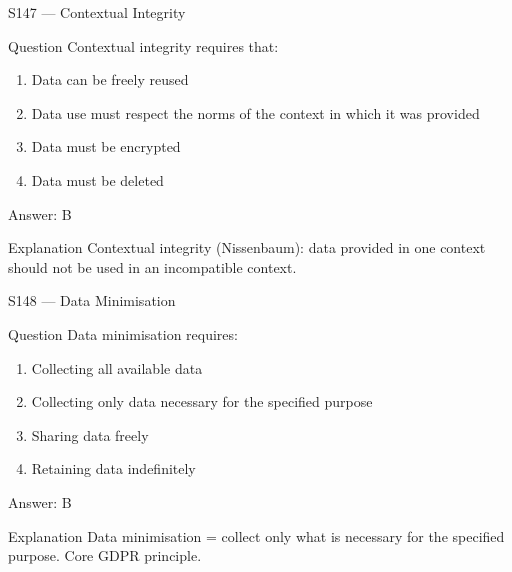 \documentclass[aspectratio=169,8pt]{beamer}
\begin{document}
	\begin{frame}{S147 --- Contextual Integrity}
		\begin{block}{Question}
			Contextual integrity requires that:
			\begin{enumerate}
				\item Data can be freely reused
				\item Data use must respect the norms of the context in which it was provided
				\item Data must be encrypted
				\item Data must be deleted
			\end{enumerate}
		\end{block}
		\begin{exampleblock}{Answer: B}\end{exampleblock}
		\begin{block}{Explanation}
			Contextual integrity (Nissenbaum): data provided in one context should not be used in an incompatible context.
		\end{block}
	\end{frame}
	
	\begin{frame}{S148 --- Data Minimisation}
		\begin{block}{Question}
			Data minimisation requires:
			\begin{enumerate}
				\item Collecting all available data
				\item Collecting only data necessary for the specified purpose
				\item Sharing data freely
				\item Retaining data indefinitely
			\end{enumerate}
		\end{block}
		\begin{exampleblock}{Answer: B}\end{exampleblock}
		\begin{block}{Explanation}
			Data minimisation = collect only what is necessary for the specified purpose. Core GDPR principle.
		\end{block}
	\end{frame}
	
\end{document}
